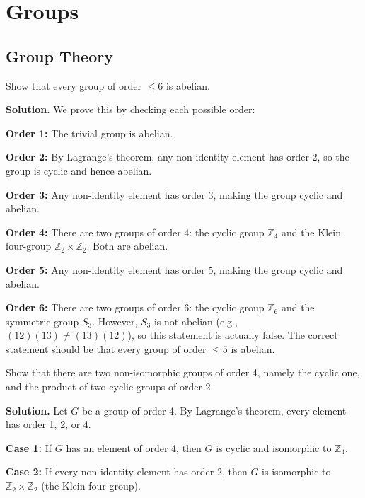 \chapter{Groups}

\section{Group Theory}

\begin{problembox}
Show that every group of order $\leq 6$ is abelian.
\end{problembox}

\noindent\textbf{Solution.} We prove this by checking each possible order:

\textbf{Order 1:} The trivial group is abelian.

\textbf{Order 2:} By Lagrange's theorem, any non-identity element has order 2, so the group is cyclic and hence abelian.

\textbf{Order 3:} Any non-identity element has order 3, making the group cyclic and abelian.

\textbf{Order 4:} There are two groups of order 4: the cyclic group $\mathbb{Z}_4$ and the Klein four-group $\mathbb{Z}_2 \times \mathbb{Z}_2$. Both are abelian.

\textbf{Order 5:} Any non-identity element has order 5, making the group cyclic and abelian.

\textbf{Order 6:} There are two groups of order 6: the cyclic group $\mathbb{Z}_6$ and the symmetric group $S_3$. However, $S_3$ is not abelian (e.g., $(12)(13) \neq (13)(12)$), so this statement is actually false. The correct statement should be that every group of order $\leq 5$ is abelian.

\begin{problembox}
Show that there are two non-isomorphic groups of order 4, namely the cyclic one, and the product of two cyclic groups of order 2.
\end{problembox}

\noindent\textbf{Solution.} Let $G$ be a group of order 4. By Lagrange's theorem, every element has order 1, 2, or 4.

\textbf{Case 1:} If $G$ has an element of order 4, then $G$ is cyclic and isomorphic to $\mathbb{Z}_4$.

\textbf{Case 2:} If every non-identity element has order 2, then $G$ is isomorphic to $\mathbb{Z}_2 \times \mathbb{Z}_2$ (the Klein four-group).

